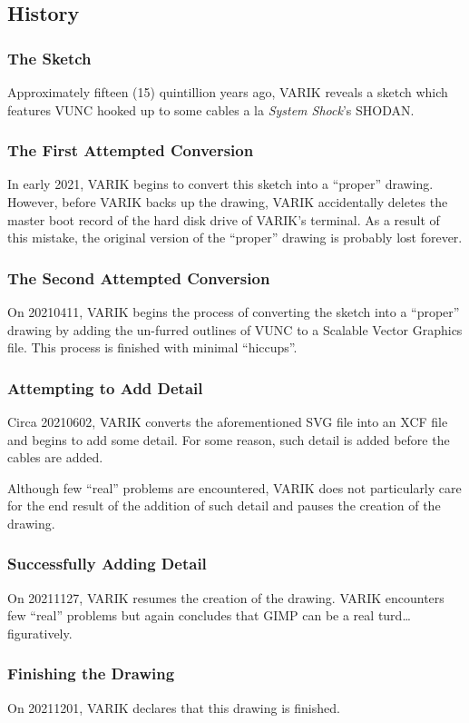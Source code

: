 \documentclass{report}
\begin{document}
\subsection{History}
\subsubsection{The Sketch}
Approximately fifteen (15) quintillion years ago, VARIK reveals a sketch which features VUNC hooked up to some cables a la \textit{System Shock}'s SHODAN.
\subsubsection{The First Attempted Conversion}
In early 2021, VARIK begins to convert this sketch into a ``proper'' drawing.  However, before VARIK backs up the drawing, VARIK accidentally deletes the master boot record of the hard disk drive of VARIK's terminal.  As a result of this mistake, the original version of the ``proper'' drawing is probably lost forever.
\subsubsection{The Second Attempted Conversion}
On 20210411, VARIK begins the process of converting the sketch into a ``proper'' drawing by adding the un-furred outlines of VUNC to a Scalable Vector Graphics file.  This process is finished with minimal ``hiccups''.
\subsubsection{Attempting to Add Detail}
Circa 20210602, VARIK converts the aforementioned SVG file into an XCF file and begins to add some detail.  For some reason, such detail is added before the cables are added.

Although few ``real'' problems are encountered, VARIK does not particularly care for the end result of the addition of such detail and pauses the creation of the drawing.
\subsubsection{Successfully Adding Detail}
On 20211127, VARIK resumes the creation of the drawing.  VARIK encounters few ``real'' problems but again concludes that GIMP can be a real turd\ldots figuratively.
\subsubsection{Finishing the Drawing}
On 20211201, VARIK declares that this drawing is finished.
\end{document}
